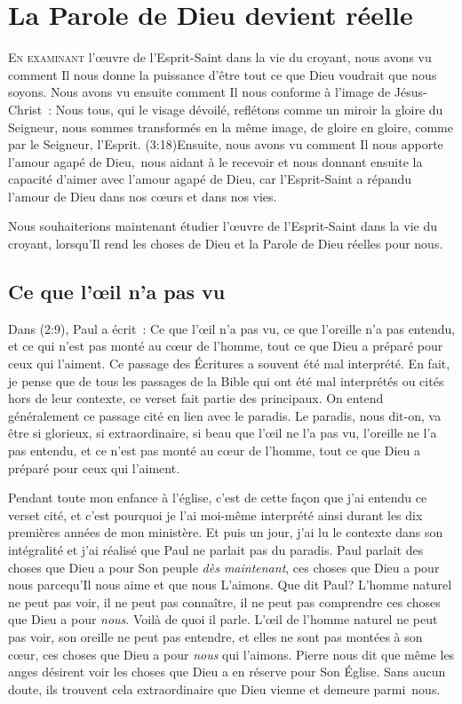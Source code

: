 \chapter{La Parole de Dieu devient r\'eelle}

\lettrine{E}{n examinant} l'\oe{}uvre
 de l'Esprit-Saint dans la vie du croyant,
 nous avons vu comment Il nous donne la puissance
 d'être tout ce que Dieu voudrait que nous soyons.
 Nous avons vu ensuite comment Il nous conforme à l'image de Jésus-Christ~:
 \Og Nous tous, qui le visage dévoilé, reflétons comme un miroir la gloire
 du Seigneur, nous sommes transformés en la même image, de gloire en gloire,
 comme par le Seigneur, l'Esprit. \Fg{}
 (3:18)Ensuite, nous avons vu comment
 Il nous apporte l'amour agapé de Dieu,~nous aidant à le recevoir
 et nous donnant ensuite la capacité d'aimer
 avec l'amour agapé de Dieu, car l'Esprit-Saint a répandu l'amour de Dieu
 dans nos cœurs et dans nos vies.

Nous souhaiterions maintenant étudier l'œuvre de l'Esprit-Saint dans la vie
 du croyant, lorsqu'Il rend les choses de Dieu et la Parole de Dieu
 réelles pour nous.


\section{Ce que l'\oe{}il n'a pas vu}

Dans (2:9), Paul a écrit~:
 \Og Ce que l'œil n'a pas vu, ce que l'oreille n'a pas entendu,
 et ce qui n'est pas monté au cœur de l'homme, tout ce que Dieu
 a préparé pour ceux qui l'aiment. \Fg{}
 Ce passage des Écritures a souvent été mal interprété. En fait,
 je pense que de tous les passages de la Bible qui ont été mal interprétés
 ou cités hors de leur contexte, ce verset fait partie des principaux.
 On entend généralement ce passage cité en lien avec le paradis.
 Le paradis, nous dit-on, va être si glorieux, si extraordinaire,
 si beau que \Og l'œil ne l'a pas vu, l'oreille ne l'a pas entendu,
 et ce n'est pas monté au cœur de l'homme, tout ce que Dieu a préparé
 pour ceux qui l'aiment. \Fg{}
 \nowidow[4]

Pendant toute mon enfance à l'église, c'est de cette façon que j'ai entendu
 ce verset cité, et c'est pourquoi je l'ai moi-même interprété ainsi
 durant les dix premières années de mon ministère.
 Et puis un jour, j'ai lu le contexte dans son intégralité et j'ai réalisé
 que Paul ne parlait pas du paradis. Paul parlait des choses que Dieu
 a pour Son peuple \emph{dès maintenant},
 ces choses que Dieu a pour nous parcequ'Il
 nous aime et que nous L'aimons. Que dit Paul?
 L'homme naturel ne peut pas voir, il ne peut pas connaître,
 il ne peut pas comprendre ces choses que Dieu a pour \emph{nous}.
 Voilà de quoi il parle. L'œil de l'homme naturel ne peut pas voir,
 son oreille ne peut pas entendre, et elles ne sont pas montées à son c\oe{}ur, ces choses que Dieu a pour \emph{nous} qui l'aimons.
 Pierre nous dit que même les anges désirent voir les choses que Dieu
 a en réserve pour Son Église.
 Sans aucun doute, ils trouvent cela extraordinaire que Dieu vienne
 et demeure parmi~nous.

